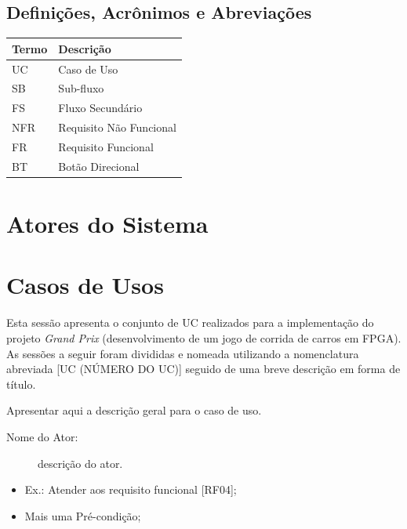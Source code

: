 \documentclass{article}
\begin{document}
  \subsection{Definições, Acrônimos e Abreviações}
  \FloatBarrier
    \begin{table}[H] 
      \begin{center}
        \begin{tabular}[pos]{|m{2cm} | m{8cm}|} 
          \hline 
          \cellcolor[gray]{0.9}\textbf{Termo} & \cellcolor[gray]{0.9}\textbf{Descrição} \\ \hline
          UC & Caso de Uso  \\ \hline
          SB & Sub-fluxo \\ \hline
          FS & Fluxo Secundário \\ \hline
          NFR & Requisito Não Funcional \\ \hline
          FR & Requisito Funcional \\ \hline
          BT & Botão Direcional \\
          \hline
        \end{tabular}
      \end{center}
    \label{tab:definicoes}
    \end{table}

  \section{Atores do Sistema}
  
  \section{Casos de Usos}
  Esta sessão apresenta o conjunto de UC realizados para a implementação do projeto \textit{Grand Prix} (desenvolvimento de um jogo de corrida de carros em FPGA). As sessões a seguir foram divididas e nomeada utilizando a nomenclatura abreviada [UC (NÚMERO DO UC)] seguido de uma breve descrição em forma de título.

  Apresentar aqui a descrição geral para o caso de uso.
  
  \actors
    \begin{description}
     \item[Nome do Ator:] descrição do ator.
    \end{description}
  
  \preconditions 
    \begin{itemize}
     \item Ex.: Atender aos requisito funcional [RF04];
     \item Mais uma Pré-condição;
    \end{itemize}
\end{document}
